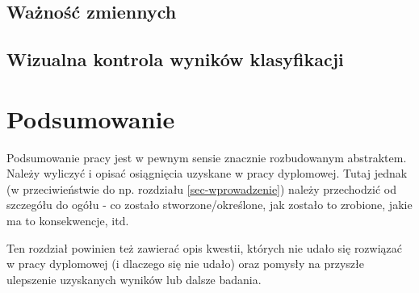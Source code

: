 \documentclass{amuthesis}
\begin{document}
\hypertarget{waux17cnoux15bux107-zmiennych-1}{%
\section{Ważność zmiennych}\label{waux17cnoux15bux107-zmiennych-1}}

\hypertarget{wizualna-kontrola-wynikuxf3w-klasyfikacji}{%
\section{Wizualna kontrola wyników
klasyfikacji}\label{wizualna-kontrola-wynikuxf3w-klasyfikacji}}


\hypertarget{podsumowanie}{%
\chapter{Podsumowanie}\label{podsumowanie}}

Podsumowanie pracy jest w pewnym sensie znacznie rozbudowanym
abstraktem. Należy wyliczyć i opisać osiągnięcia uzyskane w pracy
dyplomowej. Tutaj jednak (w przeciwieństwie do np. rozdziału
\ref{sec-wprowadzenie}) należy przechodzić od szczegółu do ogółu - co
zostało stworzone/określone, jak zostało to zrobione, jakie ma to
konsekwencje, itd.

Ten rozdział powinien też zawierać opis kwestii, których nie udało się
rozwiązać w pracy dyplomowej (i dlaczego się nie udało) oraz pomysły na
przyszłe ulepszenie uzyskanych wyników lub dalsze badania.

\printbibliography[heading=bibintoc, title=Bibliografia]
\end{document}
